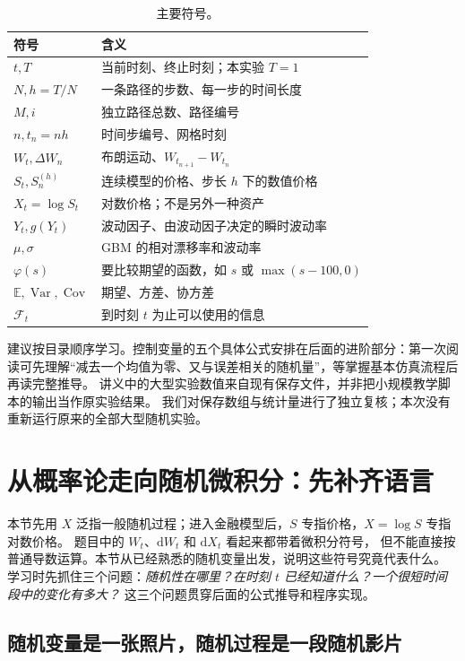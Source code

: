 \documentclass[11pt,a4paper,fontset=none]{ctexart}
\numberwithin{equation}{section}
\newcommand{\E}{\mathbb E}
\DeclareMathOperator{\Var}{Var}
\DeclareMathOperator{\Cov}{Cov}
\begin{document}
\begin{table}[htbp]\centering
\caption{主要符号。}\label{tab:notation}
\begin{tabularx}{\textwidth}{lY}\toprule
符号 & 含义\\\midrule
$t,T$ & 当前时刻、终止时刻；本实验 $T=1$\\
$N,h=T/N$ & 一条路径的步数、每一步的时间长度\\
$M,i$ & 独立路径总数、路径编号\\
$n,t_n=nh$ & 时间步编号、网格时刻\\
$W_t,\Delta W_n$ & 布朗运动、$W_{t_{n+1}}-W_{t_n}$\\
$S_t,S_n^{(h)}$ & 连续模型的价格、步长 $h$ 下的数值价格\\
$X_t=\log S_t$ & 对数价格；不是另外一种资产\\
$Y_t,g(Y_t)$ & 波动因子、由波动因子决定的瞬时波动率\\
$\mu,\sigma$ & GBM 的相对漂移率和波动率\\
$\varphi(s)$ & 要比较期望的函数，如 $s$ 或 $\max(s-100,0)$\\
$\E,\Var,\Cov$ & 期望、方差、协方差\\
$\mathcal F_t$ & 到时刻 $t$ 为止可以使用的信息\\\bottomrule
\end{tabularx}
\end{table}

建议按目录顺序学习。控制变量的五个具体公式安排在后面的进阶部分：第一次阅读可先理解“减去一个均值为零、又与误差相关的随机量”，等掌握基本仿真流程后再读完整推导。
讲义中的大型实验数值来自现有保存文件，并非把小规模教学脚本的输出当作原实验结果。
我们对保存数组与统计量进行了独立复核；本次没有重新运行原来的全部大型随机实验。


\section{从概率论走向随机微积分：先补齐语言}
\label{bg:sec:language}

本节先用 $X$ 泛指一般随机过程；进入金融模型后，$S$ 专指价格，$X=\log S$ 专指对数价格。
题目中的 $W_t$、$\mathrm dW_t$ 和 $\mathrm dX_t$ 看起来都带着微积分符号，
但不能直接按普通导数运算。本节从已经熟悉的随机变量出发，说明这些符号究竟代表什么。
学习时先抓住三个问题：\emph{随机性在哪里？在时刻 $t$ 已经知道什么？一个很短时间段中的变化有多大？}
这三个问题贯穿后面的公式推导和程序实现。

\subsection{随机变量是一张照片，随机过程是一段随机影片}
\label{bg:sub:process}
\end{document}
